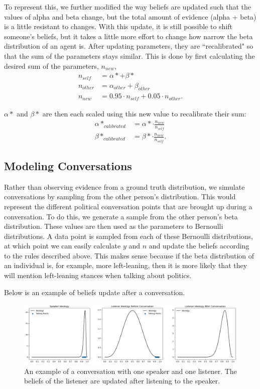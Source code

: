 \documentclass[11pt]{article}
\begin{document}
To represent this, we further modified the way beliefs are updated such that the values of alpha and beta change, but the total amount of evidence (alpha + beta) is a little resistant to changes. With this update, it is still possible to shift someone's beliefs, but it takes a little more effort to change how narrow the beta distribution of an agent is. After updating parameters, they are ``recalibrated" so that the sum of the parameters stays similar. This is done by first calculating the desired sum of the parameters, $n_{new}$,
\begin{align*}
    n_{self} &= \alpha* + \beta*\\
    n_{other} &= \alpha_{other} + \beta_{other}\\
    n_{new} &= 0.95 \cdot n_{self} + 0.05 \cdot n_{other}.
\end{align*}

$\alpha*$ and $\beta*$ are then each scaled using this new value to recalibrate their sum:
\begin{align*}
    \alpha*_{calibrated} &= \alpha* \cdot \frac{n_{new}}{n_{self}} \\
    \beta*_{calibrated} &= \beta* \cdot \frac{n_{new}}{n_{self}}.
\end{align*}


\subsection{Modeling Conversations}

Rather than observing evidence from a ground truth distribution, we simulate conversations by sampling from the other person's distribution. This would represent the different political conversation points that are brought up during a conversation. To do this, we generate a sample from the other person's beta distribution. These values are then used as the parameters to Bernoulli distributions. A data point is sampled from each of these Bernoulli distributions, at which point we can easily calculate $y$ and $n$ and update the beliefs according to the rules described above. This makes sense because if the beta distribution of an individual is, for example, more left-leaning, then it is more likely that they will mention left-leaning stances when talking about politics.

Below is an example of beliefs update after a conversation.

\begin{figure}[h]
\centering
\includegraphics[scale=0.4]{images/modeling_conversation.png}
\caption{An example of a conversation with one speaker and one listener. The beliefs of the listener are updated after listening to the speaker.}
\end{figure}
\end{document}
